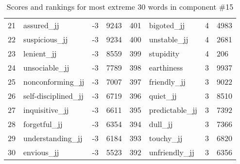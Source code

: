 \begin{table}[tbp]
\begin{tabular}{| rlr@{.}l | rlr@{.}l |}
    21 & assured\_jj & -3 & 9243    &    401 & bigoted\_jj & 4 & 4983 \\
    22 & suspicious\_jj & -3 & 9234    &    400 & unstable\_jj & 4 & 2681 \\
    23 & lenient\_jj & -3 & 8559    &    399 & stupidity & 4 & 206 \\
    24 & unsociable\_jj & -3 & 7789    &    398 & earthiness & 3 & 9937 \\
    25 & nonconforming\_jj & -3 & 7007    &    397 & friendly\_jj & 3 & 9022 \\
    26 & self-disciplined\_jj & -3 & 6719    &    396 & quiet\_jj & 3 & 8510 \\
    27 & inquisitive\_jj & -3 & 6611    &    395 & predictable\_jj & 3 & 7392 \\
    28 & forgetful\_jj & -3 & 6354    &    394 & dull\_jj & 3 & 7366 \\
    29 & understanding\_jj & -3 & 6184    &    393 & touchy\_jj & 3 & 6820 \\
    30 & envious\_jj & -3 & 5523    &    392 & unfriendly\_jj & 3 & 6356 \\
    \hline
    \end{tabular}
    \caption{Scores and rankings for most extreme 30 words in component \#15} 
\end{table}
\clearpage
